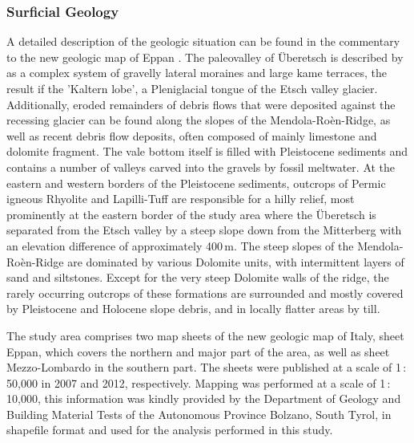 \documentclass[preprint,12pt,authoryear]{elsarticle}
\begin{document}
\subsubsection{Surficial Geology}
A detailed  description of the geologic situation can be found in the commentary to the new geologic map of Eppan \citep{Avanzini2006}. 
The paleovalley of {\"U}beretsch is described by \cite{Scholz2005} as a complex system of gravelly lateral moraines and large kame terraces, the result if the 'Kaltern lobe', a Pleniglacial tongue of the Etsch valley glacier. Additionally, eroded remainders of debris flows that were deposited against the recessing glacier can be found along the slopes of the Mendola-Ro\`en-Ridge, as well as recent debris flow deposits, often composed of mainly limestone and dolomite fragment. The vale bottom itself is filled with Pleistocene sediments and contains a  number of valleys carved into the gravels by fossil meltwater. At the eastern and western borders of the Pleistocene sediments, outcrops of Permic igneous Rhyolite and Lapilli-Tuff are responsible for a hilly relief, most prominently at the eastern border of the study area where the {\"U}beretsch is separated from the Etsch valley by a steep slope down from the Mitterberg with an elevation difference of approximately 400\,m.   
The steep slopes of the Mendola-Ro\`en-Ridge are dominated by various Dolomite units, with intermittent layers of sand and siltstones. Except for the very steep Dolomite walls of the ridge, the rarely occurring outcrops of these formations are surrounded and mostly covered by Pleistocene and Holocene slope debris, and in locally flatter areas by till. 
 
The study area comprises two map sheets of the new geologic map of Italy, sheet Eppan,  which covers the northern and major part of the area, as well as sheet Mezzo-Lombardo in the southern part. The sheets were published at a scale of 1\,:\,50,000 in 2007 and 2012, respectively. Mapping was performed at a scale of 1\,:\,10,000, this information was kindly provided by the Department of Geology and Building Material Tests of the Autonomous Province Bolzano, South Tyrol, in shapefile format and used for the analysis performed in this study.
 
\end{document}
